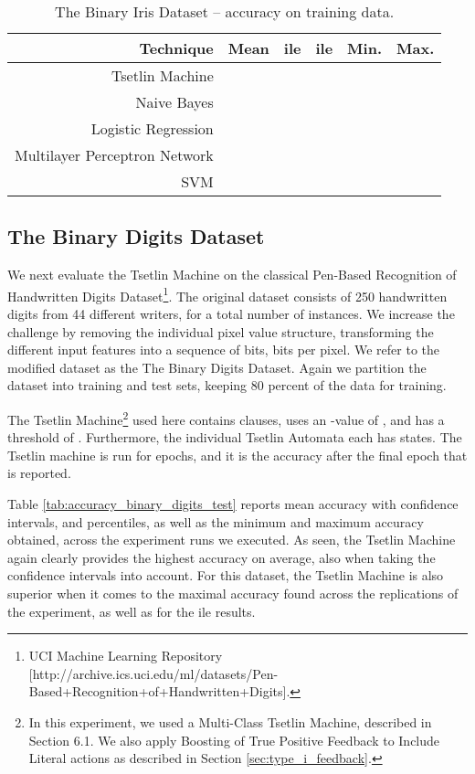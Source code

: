 \documentclass[11pt,a4paper]{article}
\begin{document}
\begin{table}[!bh]
    \centering
    \begin{tabular}{r||c|c|c|c|c}
         \bf Technique&\bf Mean&\bf ile &\bf ile&\bf Min.&\bf Max.\\
         \hline
    Tsetlin Machine&&&&&\\
    Naive Bayes&&&&&\\
    Logistic Regression&&&&&\\
    Multilayer Perceptron Network&&&&&\\
    SVM&&&&&
    \end{tabular}
    \caption{The Binary Iris Dataset -- accuracy on training data.}
    \label{tab:accuracy_binary_iris_training}
\end{table}

\subsection{The Binary Digits Dataset}

We next evaluate the Tsetlin Machine on the classical Pen-Based Recognition of Handwritten Digits Dataset\footnote{UCI Machine Learning Repository [http://archive.ics.uci.edu/ml/datasets/Pen-Based+Recognition+of+Handwritten+Digits].}. The original dataset consists of 250 handwritten digits from 44 different writers, for a total number of  instances. We increase the challenge by removing the individual pixel value structure, transforming the  different input features into a sequence of  bits,  bits per pixel. We refer to the modified dataset as the The Binary Digits Dataset. Again we partition the dataset into training and test sets, keeping 80 percent of the data for training.

The Tsetlin Machine\footnote{In this experiment, we used a Multi-Class Tsetlin Machine, described in Section 6.1.  We also apply Boosting of True  Positive  Feedback  to  Include  Literal  actions as described in Section \ref{sec:type_i_feedback}.} used here contains  clauses, uses an -value of , and has a threshold  of . Furthermore, the individual Tsetlin Automata each has  states. The Tsetlin machine is run for  epochs, and it is the accuracy after the final epoch that is reported.

Table \ref{tab:accuracy_binary_digits_test} reports mean accuracy with  confidence intervals,  and  percentiles, as well as the minimum and maximum accuracy obtained, across the  experiment runs we executed. As seen, the Tsetlin Machine again clearly provides the highest accuracy on average, also when taking the  confidence intervals into account. For this dataset, the Tsetlin Machine is also superior when it comes to the maximal accuracy found across the  replications of the experiment, as well as for the ile results.
\end{document}
